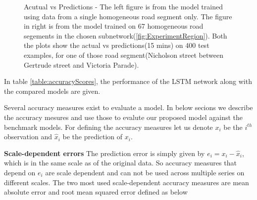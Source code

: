 \begin{figure}[h]
    \qquad

    \caption[Acutual vs Predictions, using deep LSTM networks]{Acutual vs Predictions - The left
    figure is from the model trained using data from a single homogeneous road segment only. The
    figure in right is from the model trained on 67 homogeneous road segements in the chosen
    subnetwork(\ref{fig:ExperimentRegion}). Both the plots show the actual vs predictions(15
    mins) on 400 test examples, for one of those road segment(Nicholson street between Gertrude
    street and Victoria Parade).}
    \label{fig:LSTMActualPredicted}
\end{figure}

In table \ref{table:accuracyScores}, the performance of the LSTM network along with the compared
models are given.

Several accuracy measures exist to evaluate a model. In below secions we describe
the accuracy mesures and use those to evalute our proposed model against the benchmark models.
For defining the accuracy measures let us denote $x_{i}$ be the $i^{th}$ observation and
$\hat{x}_{i}$ be the prediction of $x_{i}$.

\textbf{Scale-dependent errors}
The prediction error is simply given by $e_{i} = x_{i} - \hat{x}_{i}$, which is in the same scale
as of the original data. So accuracy measures that depend on $e_{i}$ are scale dependent and can
not be used across multiple series on different scales. The two most used scale-dependent
accuracy measures are mean absolute error and root mean squared error defined as below

